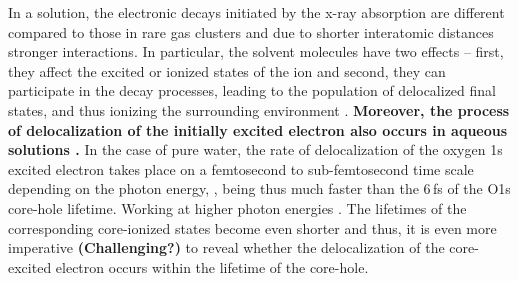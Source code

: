 In a solution, the electronic decays initiated by the x-ray absorption are different compared to those in rare gas clusters  and due to shorter interatomic distances  stronger interactions. In particular, the solvent molecules have two effects -- first, they affect the excited \citep{miteva16:16671} or ionized states of the ion and second, they can participate in the decay processes, leading to the population of delocalized final states, and thus ionizing the surrounding environment \citep{Pokapanich09:7264,Pokapanich11:13430,Stumpf16:237}.\textbf{ Moreover, the process of delocalization of the initially excited electron also occurs in aqueous solutions \citep{Nordlund07:217406,Ottosson11:13489}.}
In the case of pure water, the rate of delocalization of the oxygen 1s excited electron takes place on a femtosecond to sub-femtosecond time scale depending on the photon energy, , being thus much faster than the 6\,fs of the O1s core-hole lifetime\citep{Nordlund07:217406}. Working at higher photon energies . The lifetimes of the corresponding core-ionized states become even shorter \citep{ceolin17} and thus, it is even more imperative\textbf{ (Challenging?) }to reveal whether the delocalization of the core-excited electron occurs within the lifetime of the core-hole.


